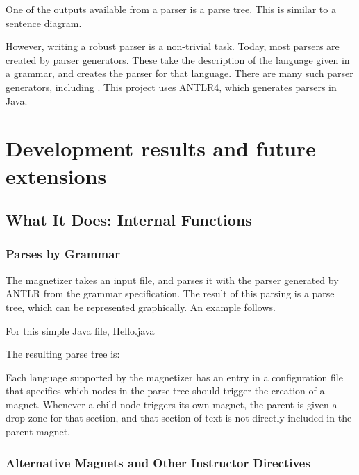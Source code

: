 \documentclass[letter,10pt]{article}
\begin{document}
One of the outputs available from a parser is a parse tree. This is 
similar to a sentence diagram.

However, writing a robust parser is a non-trivial task. Today, most 
parsers are created by parser generators. These take the description of 
the language given in a grammar, and creates the parser for that 
language. There are many such parser generators, including . This project uses ANTLR4, which generates 
parsers in Java.  

\section{Development results and future extensions}

\subsection{What It Does: Internal Functions}

\subsubsection{Parses by Grammar}

The magnetizer  takes an input 
file, and parses it with the parser generated by ANTLR from the grammar 
specification. The result of this parsing is a parse tree, which can 
be represented graphically. An example follows.

For this simple Java file, Hello.java

The resulting parse tree is:

\label{fig:parseTree}

Each language supported by the magnetizer has an entry in a 
configuration file that specifies which nodes in the parse tree should 
trigger the creation of a magnet. Whenever a child node triggers its 
own magnet, the parent is given a drop zone for that section, and that 
section of text is not directly included in the parent magnet.




\subsubsection{Alternative Magnets and Other Instructor Directives}
\end{document}
